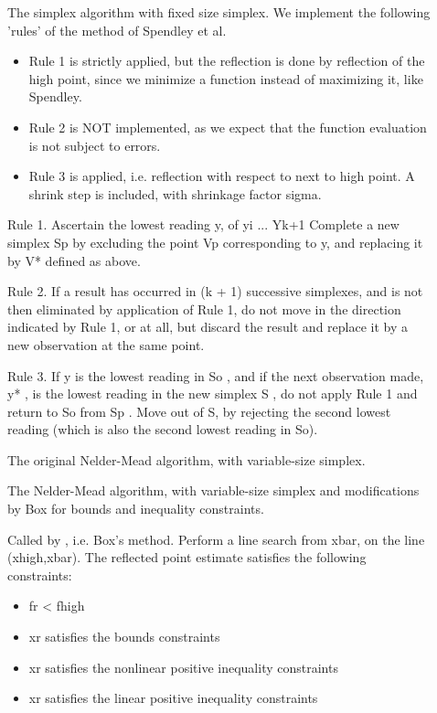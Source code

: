 \begin{Details}\relax
\begin{description}

\item[] The simplex algorithm with fixed size simplex.
We implement the following 'rules' of the method of Spendley et al.
\begin{itemize}

\item Rule 1 is strictly applied, but the reflection is done by reflection
of the high point, since we minimize a function instead of maximizing it,
like Spendley.
\item Rule 2 is NOT implemented, as we expect that the function evaluation
is not subject to errors.
\item Rule 3 is applied, i.e. reflection with respect to next to high point.
A shrink step is included, with shrinkage factor sigma.

\end{itemize}


Rule 1. Ascertain the lowest reading y, of yi ... Yk+1
Complete a new simplex Sp by excluding the point Vp corresponding to
y, and replacing it by V* defined as above.

Rule 2. If a result has occurred in (k + 1) successive simplexes, and is not
then eliminated by application of Rule 1, do not move in the direction
indicated by Rule 1, or at all, but discard the result and replace it by a
new observation at the same point.

Rule 3. If y is the lowest reading in So , and if the next observation made,
y* , is the lowest reading in the new simplex S , do not apply Rule 1 and
return to So from Sp . Move out of S, by rejecting the second lowest reading
(which is also the second lowest reading in So).

\item[] The original Nelder-Mead algorithm, with
variable-size simplex.
\item[] The Nelder-Mead algorithm, with variable-size
simplex and modifications by Box for bounds and inequality constraints.
\item[] Called by , i.e. Box's
method. Perform a line search from xbar, on the line (xhigh,xbar). The
reflected point estimate satisfies the following constraints: \begin{itemize}

\item fr < fhigh
\item xr satisfies the bounds constraints
\item xr satisfies the nonlinear positive inequality constraints
\item xr satisfies the linear positive inequality constraints


\end{itemize}
\end{description}
\end{Details}
